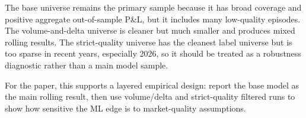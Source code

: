 \documentclass[11pt]{article}
\begin{document}
The base universe remains the primary sample because it has broad coverage and
positive aggregate out-of-sample P\&L, but it includes many low-quality episodes.
The volume-and-delta universe is cleaner but much smaller and produces mixed
rolling results. The strict-quality universe has the cleanest label universe but
is too sparse in recent years, especially 2026, so it should be treated as a
robustness diagnostic rather than a main model sample.

For the paper, this supports a layered empirical design: report the base model
as the main rolling result, then use volume/delta and strict-quality filtered
runs to show how sensitive the ML edge is to market-quality assumptions.
\end{document}
